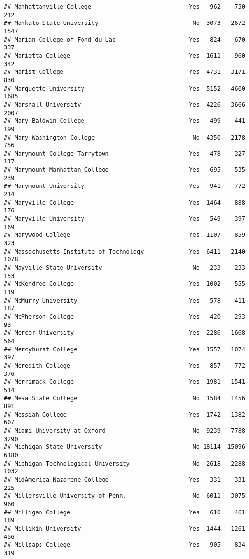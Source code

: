 \documentclass[
]{article}
\begin{document}
\begin{verbatim}
## Manhattanville College                            Yes   962    750    212
## Mankato State University                           No  3073   2672   1547
## Marian College of Fond du Lac                     Yes   824    670    337
## Marietta College                                  Yes  1611    960    342
## Marist College                                    Yes  4731   3171    830
## Marquette University                              Yes  5152   4600   1685
## Marshall University                               Yes  4226   3666   2007
## Mary Baldwin College                              Yes   499    441    199
## Mary Washington College                            No  4350   2178    756
## Marymount College Tarrytown                       Yes   478    327    117
## Marymount Manhattan College                       Yes   695    535    239
## Marymount University                              Yes   941    772    214
## Maryville College                                 Yes  1464    888    176
## Maryville University                              Yes   549    397    169
## Marywood College                                  Yes  1107    859    323
## Massachusetts Institute of Technology             Yes  6411   2140   1078
## Mayville State University                          No   233    233    153
## McKendree College                                 Yes  1002    555    119
## McMurry University                                Yes   578    411    187
## McPherson College                                 Yes   420    293     93
## Mercer University                                 Yes  2286   1668    564
## Mercyhurst College                                Yes  1557   1074    397
## Meredith College                                  Yes   857    772    376
## Merrimack College                                 Yes  1981   1541    514
## Mesa State College                                 No  1584   1456    891
## Messiah College                                   Yes  1742   1382    607
## Miami University at Oxford                         No  9239   7788   3290
## Michigan State University                          No 18114  15096   6180
## Michigan Technological University                  No  2618   2288   1032
## MidAmerica Nazarene College                       Yes   331    331    225
## Millersville University of Penn.                   No  6011   3075    960
## Milligan College                                  Yes   610    461    189
## Millikin University                               Yes  1444   1261    456
## Millsaps College                                  Yes   905    834    319

\end{verbatim}
\end{document}
